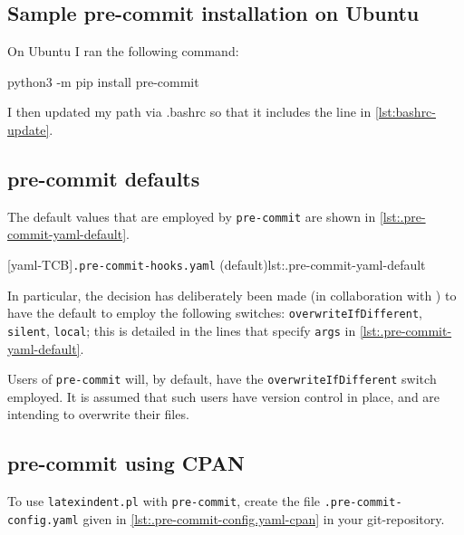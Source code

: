  \subsection{Sample pre-commit installation on Ubuntu}\label{sec:pre-commit-ubuntu}
  On Ubuntu I ran the following command:
  \begin{commandshell}
python3 -m pip install pre-commit
\end{commandshell}
  I then updated my path via .bashrc so that it includes the line in
  \cref{lst:bashrc-update}.

 \subsection{pre-commit defaults}
  The default values that are employed by \texttt{pre-commit} are shown in \cref{lst:.pre-commit-yaml-default}.

  [yaml-TCB]{\texttt{.pre-commit-hooks.yaml} (default)}{lst:.pre-commit-yaml-default}

  In particular, the decision has deliberately been made (in collaboration with
  \cite{holzhausprecommit}) to have the default to employ the following switches:
  \texttt{overwriteIfDifferent}, \texttt{silent}, \texttt{local}; this is detailed in the
  lines that specify \texttt{args} in \cref{lst:.pre-commit-yaml-default}.

  \begin{warning}
   Users of \texttt{pre-commit} will, by default, have the \texttt{overwriteIfDifferent}
   switch employed. It is assumed that such users have version control in place, and are
   intending to overwrite their files.
  \end{warning}

 \subsection{pre-commit using CPAN}\label{sec:pre-commit-cpan}

  To use \texttt{latexindent.pl} with \texttt{pre-commit}, create the file
  \texttt{.pre-commit-config.yaml} given in \cref{lst:.pre-commit-config.yaml-cpan} in your
  git-repository.   

